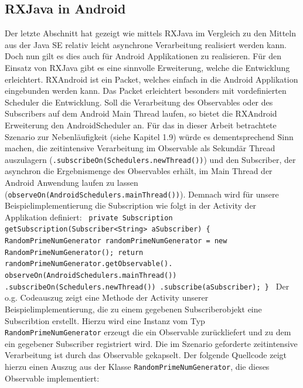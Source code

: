 \documentclass[12pt,oneside,a4paper,bibtotoc,liststotoc]{scrreprt}
\begin{document}
\subsection{RXJava in Android}
Der letzte Abschnitt hat gezeigt wie mittels RXJava im Vergleich zu den Mitteln aus der Java SE relativ leicht asynchrone Verarbeitung realisiert werden kann. Doch nun gilt es dies auch für Android Applikationen zu realisieren. Für den Einsatz von RXJava gibt es eine sinnvolle Erweiterung, welche die Entwicklung erleichtert. RXAndroid ist ein Packet, welches einfach in die Android Applikation eingebunden werden kann. Das Packet erleichtert besonders mit vordefinierten Scheduler die Entwicklung. Soll die Verarbeitung des Observables oder des Subscribers auf dem Android Main Thread laufen, so bietet die RXAndroid Erweiterung den AndroidScheduler an. Für das in dieser Arbeit betrachtete Szenario zur Nebenläufigkeit (siehe Kapitel 1.9) würde es dementsprechend Sinn machen, die zeitintensive Verarbeitung im Observable als Sekundär Thread auszulagern (\texttt{.subscribeOn(Schedulers.newThread())}) und den Subscriber, der asynchron die Ergebnismenge des Observables erhält, im Main Thread der Android Anwendung laufen zu lassen (\texttt{observeOn(AndroidSchedulers.mainThread())}). Demnach wird für unsere Beispielimplementierung die Subscription wie folgt in der Activity der Applikation definiert:\newline
\texttt{\newline
private Subscription getSubscription(Subscriber<String> aSubscriber) \{\newline
       RandomPrimeNumGenerator randomPrimeNumGenerator =\newline 
       new RandomPrimeNumGenerator();\newline
\newline
       return randomPrimeNumGenerator.getObservable().\newline
       observeOn(AndroidSchedulers.mainThread())\newline
               .subscribeOn(Schedulers.newThread())\newline
               .subscribe(aSubscriber);\newline
   \}\newline
   }\newline
Der o.g. Codeauszug zeigt eine Methode der Activity unserer Beispielimplementierung, die zu einem gegebenen Subscriberobjekt eine Subscribtion erstellt. Hierzu wird eine Instanz vom Typ \texttt{RandomPrimeNumGenerator} erzeugt die ein Observable zurückliefert und zu dem ein gegebener Subscriber registriert wird. Die im Szenario geforderte zeitintensive Verarbeitung ist durch das Observable gekapselt. Der folgende Quellcode zeigt hierzu einen Auszug aus der Klasse \texttt{RandomPrimeNumGenerator}, die dieses Observable implementiert:\newline
\end{document}
